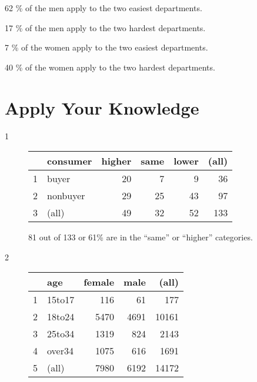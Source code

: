 \documentclass[landscape]{exam}
\begin{document}
  \begin{itemize*}
    \item 62 \% of the men apply to the two easiest departments.
    \item 17 \% of the men apply to the two hardest departments.
    \item 7 \% of the women apply to the two easiest departments.
    \item 40 \% of the women apply to the two hardest departments.
  \end{itemize*}

  \section{Apply Your Knowledge}

  \begin{description}
    \item[1] 
      \begin{table}[H]
        \centering
        \begin{tabular}{rlrrrr}
          \toprule
                   & consumer & higher & same & lower & (all) \\
          \midrule
          1        & buyer    & 20     & 7    & 9     & 36 \\
          2        & nonbuyer & 29     & 25   & 43    & 97 \\
          3        & (all)    & 49     & 32   & 52    & 133 \\
          \bottomrule
        \end{tabular}
      \end{table}

    81 out of 133 or 61\% are in the ``same'' or ``higher'' categories.

    \item[2]
      \begin{table}[H]
        \centering
        \begin{tabular}{rlrrr}
          \toprule
                   & age    & female & male & (all) \\
          \midrule
          1        & 15to17 & 116    & 61   & 177 \\
          2        & 18to24 & 5470   & 4691 & 10161 \\
          3        & 25to34 & 1319   & 824  & 2143 \\
          4        & over34 & 1075   & 616  & 1691 \\
          5        & (all)  & 7980   & 6192 & 14172 \\
          \bottomrule
        \end{tabular}
      \end{table}


\end{description}
\end{document}
